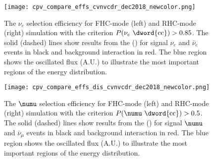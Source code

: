\begin{figure}
    \centering
		\texttt{[image: cpv\_compare\_effs\_cvnvcdr\_dec2018\_newcolor.png]} %
	\caption[The $\nu_e$ CC selection efficiency for $P(\nu_e \textrm{CC}) > 0.85$]{The $\nu_e$  selection efficiency for FHC-mode (left) and RHC-mode (right) simulation with the criterion $P(\nu_e \textrm{ \dword{cc}}) > 0.85$. The solid (dashed) lines show results from the  () for signal $\nu_e$  and $\bar{\nu}_e$  events in black and  background interaction in red. The blue region shows the oscillated flux (A.U.) to illustrate the most important regions of the energy distribution.}
    \label{fig:nueeff}
\end{figure}

\begin{figure}
    \centering
		\texttt{[image: cpv\_compare\_effs\_dis\_cvnvcdr\_dec2018\_newcolor.png]} 
	\caption[The $\numu$ CC selection efficiency for $P(\numu \textrm{CC}) > 0.5$]{The $\numu$  selection efficiency for FHC-mode (left) and RHC-mode (right) simulation with the criterion $P(\numu \textrm{ \dword{cc}}) > 0.5$. The solid (dashed) lines show results from the  () for signal $\numu$  and $\bar{\nu}_\mu$  events in black and  background interaction in red. The blue region shows the oscillated flux (A.U.) to illustrate the most important regions of the energy distribution.}
    \label{fig:numueff}
\end{figure}



